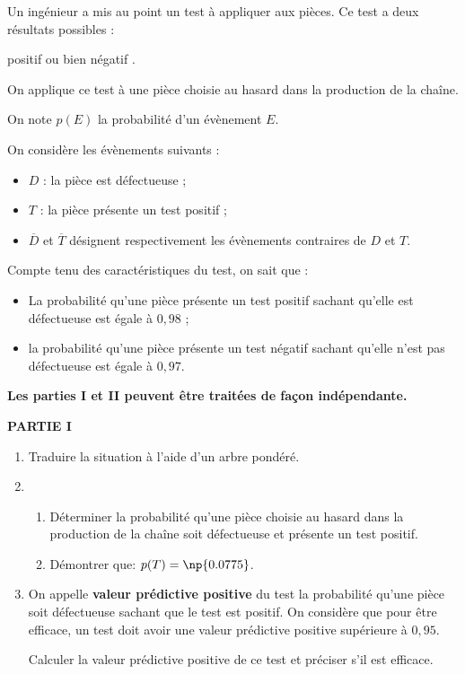 \documentclass[11pt,a4paper,french]{article}
\begin{document}
Un ingénieur a mis au point un test à appliquer aux pièces. Ce test a deux résultats possibles :

\og positif \fg{} ou bien \og négatif \fg.

On applique ce test à une pièce choisie au hasard dans la production de la chaîne.

On note $p(E)$ la probabilité d'un évènement $E$.

On considère les évènements suivants :

\begin{itemize}
\item $D$ : \og la pièce est défectueuse \fg{} ;
\item $T$ : \og la pièce présente un test positif \fg {};
\item $\overline{D}$ et $\overline{T}$ désignent respectivement les évènements contraires de $D$ et $T$.
\end{itemize}

Compte tenu des caractéristiques du test, on sait que :
\begin{itemize}
\item La probabilité qu'une pièce présente un test positif sachant qu'elle est défectueuse est égale à $0,98$ ;
\item la probabilité qu'une pièce présente un test négatif sachant qu'elle n'est pas
défectueuse est égale à $0,97$.
\end{itemize}
\medskip
\begin{center}
\textbf{Les parties I et II peuvent être traitées de façon indépendante.}
\end{center}

\medskip

\textbf{PARTIE I}

\medskip

\begin{enumerate}
\item Traduire la situation à l'aide d'un arbre pondéré.
\item \begin{enumerate}
\item Déterminer la probabilité qu'une pièce choisie au hasard dans la production de la
chaîne soit défectueuse et présente un test positif.
\item Démontrer que: $p(T) = \np{0.0775}$.
\end{enumerate}
\item On appelle \textbf{valeur prédictive positive} du test la probabilité qu'une pièce soit
défectueuse sachant que le test est positif. On considère que pour être efficace, un
test doit avoir une valeur prédictive positive supérieure à $0,95$.

Calculer la valeur prédictive positive de ce test et préciser s'il est efficace.
\end{enumerate}
\medskip
\end{document}
